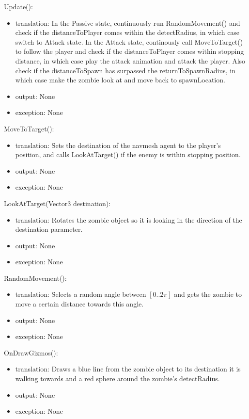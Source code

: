 \documentclass[12pt]{article}
\begin{document}
\noindent Update():
\begin{itemize}
\item translation: In the Passive state, continuously run RandomMovement() and check if the distanceToPlayer comes within the detectRadius, in which case switch to Attack state. In the Attack state, continously call MoveToTarget() to follow the player and check if the distanceToPlayer comes within stopping distance, in which case play the attack animation and attack the player. Also check if the distanceToSpawn has surpassed the returnToSpawnRadius, in which case make the zombie look at and move back to spawnLocation.
\item output: None
\item exception: None
\end{itemize}

\noindent MoveToTarget():
\begin{itemize}
\item translation: Sets the destination of the navmesh agent to the player's position, and calls LookAtTarget() if the enemy is within stopping position.
\item output: None
\item exception: None
\end{itemize}

\noindent LookAtTarget(Vector3 destination):
\begin{itemize}
\item translation: Rotates the zombie object so it is looking in the direction of the destination parameter.
\item output: None
\item exception: None
\end{itemize}

\noindent RandomMovement():
\begin{itemize}
\item translation: Selects a random angle between $[0..2\pi]$ and gets the zombie to move a certain distance towards this angle.
\item output: None
\item exception: None
\end{itemize}

\noindent OnDrawGizmos():
\begin{itemize}
\item translation: Draws a blue line from the zombie object to its destination it is walking towards and a red sphere around the zombie's detectRadius.
\item output: None
\item exception: None
\end{itemize}
\end{document}
